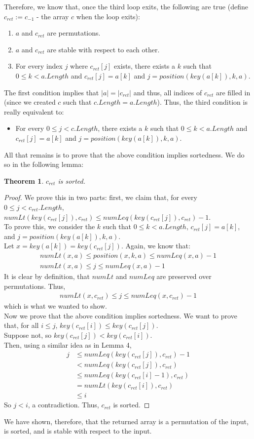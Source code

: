 \documentclass{article}
\newtheorem{theorem}{Theorem}
\begin{document}
Therefore, we know that, once the third loop exits, the following are true (define $c_{ret} := c_{-1}$ - the array $c$ when the loop exits):
\begin{enumerate}
\item
$a$ and $c_{ret}$ are permutations.
\item
$a$ and $c_{ret}$ are stable with respect to each other.
\item
For every index $j$ where $c_{ret}[j]$ exists, there exists a $k$ such that $0 \leq k < a.Length$ and $c_{ret}[j] = a[k]$ and $j = position(key(a[k]), k, a)$.
\end{enumerate}
The first condition implies that $|a| = |c_{ret}|$ and thus, all indices of $c_{ret}$ are filled in (since we created $c$ such that $c.Length = a.Length$). Thus, the third condition is really equivalent to:
\begin{itemize}
\item
For every $0 \leq j < c.Length$, there exists a $k$ such that $0 \leq k < a.Length$ and $c_{ret}[j] = a[k]$ and $j = position(key(a[k]), k, a)$.
\end{itemize}
All that remains is to prove that the above condition implies sortedness. We do so in the following lemma:
\begin{theorem}
$c_{ret}$ is sorted.
\end{theorem}
\begin{proof}
We prove this in two parts: first, we claim that, for every $0 \leq j < c_{ret}.Length$, $numLt(key(c_{ret}[j]), c_{ret}) \leq numLeq(key(c_{ret}[j]), c_{ret}) - 1$.
\\To prove this, we consider the $k$ such that $0 \leq k < a.Length$, $c_{ret}[j] = a[k]$, and $j = position(key(a[k]), k, a)$.
\\Let $x = key(a[k]) = key(c_{ret}[j])$. Again, we know that:
\begin{align*}
numLt(x, a) \leq position(x, k, a) \leq numLeq(x, a) - 1 \\
numLt(x, a) \leq j \leq numLeq(x, a) - 1
\end{align*}
It is clear by definition, that $numLt$ and $numLeq$ are preserved over permutations. Thus,
\begin{align*}
numLt(x, c_{ret}) \leq j \leq numLeq(x, c_{ret}) - 1
\end{align*}
which is what we wanted to show.
\\Now we prove that the above condition implies sortedness. We want to prove that, for all $i \leq j$, $key(c_{ret}[i]) \leq key(c_{ret}[j])$.
\\Suppose not, so $key(c_{ret}[j]) < key(c_{ret}[i])$.
\\Then, using a similar idea as in Lemma 4, 
\begin{align*}
j &\leq numLeq(key(c_{ret}[j]), c_{ret}) - 1 \\
&< numLeq(key(c_{ret}[j]), c_{ret}) \\
&\leq numLeq(key(c_{ret}[i] - 1), c_{ret}) \\
&= numLt(key(c_{ret}[i]), c_{ret}) \\
&\leq i
\end{align*}
So $j < i$, a contradiction. Thus, $c_{ret}$ is sorted.
\end{proof}
We have shown, therefore, that the returned array is a permutation of the input, is sorted, and is stable with respect to the input.
\end{document}
